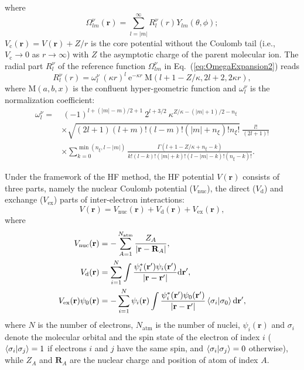 \documentclass[preprint,12pt]{elsarticle} %
\newcommand{\bn}[1]{\mathbf{#1}}    %
\renewcommand{\rm}[1]{\mathrm{#1}}    %
\newcommand{\dd}{\mathrm{d}}    %
\newcommand{\ee}{\mathrm{e}}    %
\newcommand{\abs}[1]{\lvert #1 \rvert}  %
\begin{document}
where
\begin{equation}
    \Omega^\nu_{lm}(\bn{r}) = \sum_{l=|m|}^{\infty} R_l^\nu(r) Y_{lm}(\theta, \phi);
    \label{eq:OmegaExpansion2}
\end{equation}
$V_{\rm{c}}(\bn{r}) = V(\bn{r}) + Z/r$ is the core potential without the Coulomb tail (i.e., $V_{\rm{c}} \rightarrow 0$ as $r\rightarrow \infty$) with $Z$ the asymptotic charge of the parent molecular ion.
The radial part $R_l^\nu$ of the reference function $\Omega_{lm}^\nu$ in Eq.~(\ref{eq:OmegaExpansion2}) reads
\begin{equation}
    R_l^\nu(r)=\omega_l^\nu \ (\kappa r)^l \ \ee^{-\kappa r} \ \rm{M}(l+1-Z/\kappa, 2l+2, 2 \kappa r),
\end{equation}
where $\rm{M}(a, b, x)$ is the confluent hyper-geometric function \cite{olver_nist_2010} and $\omega_l^\nu$ is the normalization coefficient:
\begin{align}
    \omega_l^\nu = & \      (-1)^{l+(\abs{m}-m)/2+1}\ 2^{l+3/2}\ \kappa^{Z/\kappa-(\abs{m}+1)/2-n_\xi} \nonumber \\
                   & \times \sqrt{(2l+1)(l+m)!(l-m)!(\abs{m}+n_\xi)!n_\xi!}\ \frac{l!}{(2l+1)!} \nonumber \\
                   & \times \!\!\!\!\!\! \sum_{k=0}^{\min{(n_\xi,l-\abs{m})}} \!\!\!\!\!\!\!\!\!\! \frac{\Gamma(l+1-Z/\kappa+n_\xi-k)}{k!(l-k)!(\abs{m}+k)!(l-\abs{m}-k)!(n_\xi-k)!}.
\end{align}

Under the framework of the HF method, the HF potential $V(\bn{r})$ consists of three parts, namely the nuclear Coulomb potential ($V_{\rm{nuc}}$), the direct ($V_{\rm{d}}$) and exchange ($V_{\rm{ex}}$) parts of inter-electron interactions:
\begin{equation}
    V(\bn{r}) = V_{\rm{nuc}}(\bn{r}) + V_{\rm{d}}(\bn{r}) + V_{\rm{ex}}(\bn{r}),
\end{equation}
where
\begin{align}
    V_{\rm{nuc}}(\bn{r}) &= -\sum_{A=1}^{N_{\rm{atm}}} \frac{Z_A}{\left|\bn{r}-\bn{R}_A\right|}, \label{eq:Vnuc} \\
    V_{\rm{d}}(\bn{r}) &= \sum_{i=1}^N \int \frac{\psi_i^*(\bn{r}') \psi_i(\bn{r}')}{\abs{\bn{r}-\bn{r}'}} \dd \bn{r}', \label{eq:Vd} \\
    V_{\rm{ex}}(\bn{r}) \psi_0(\bn{r}) &= -\sum_{i=1}^N \psi_i(\bn{r}) \int \frac{\psi_i^*(\bn{r}') \psi_0(\bn{r}')}{\abs{\bn{r}-\bn{r}'}} \braket{\sigma_i | \sigma_0} \dd \bn{r}', \label{eq:VexPsi0}
\end{align}
where $N$ is the number of electrons, $N_{\rm{atm}}$ is the number of nuclei, $\psi_i(\bn{r})$ and $\sigma_i$ denote the molecular orbital and the spin state of the electron of index $i$ ($\braket{\sigma_i | \sigma_j}=1$ if electrons $i$ and $j$ have the same spin, and $\braket{\sigma_i | \sigma_j}=0$ otherwise), while $Z_A$ and $\bn{R}_A$ are the nuclear charge and position of atom of index $A$.
\end{document}
